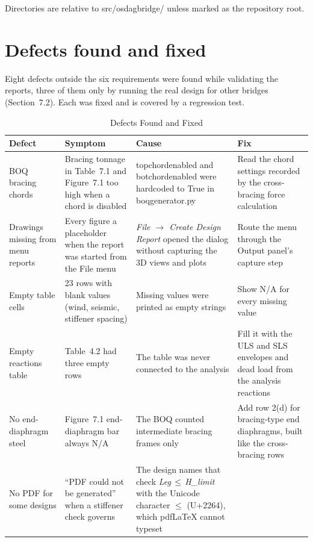 \documentclass[11pt,a4paper]{article}
\newcommand{\thead}{\rowcolor{headbg}}
\newcommand{\hd}[1]{\sffamily\bfseries\color{ink}#1}
\newcommand{\breakus}{\textunderscore\allowbreak}
\newcommand{\code}[1]{{\ttfamily\let\_\breakus #1}}
\newcommand{\file}[1]{{\ttfamily\let\_\breakus #1}}
\begin{document}
{\footnotesize\color{muted}Directories are relative to \file{src/osdagbridge/} unless marked as the repository root.}

\section{Defects found and fixed}\label{sec:defects}

Eight defects outside the six requirements were found while validating the reports, three of them only by running
the real design for other bridges (Section~7.2). Each was fixed and is covered by a regression test.

\begin{table}[!htbp]
\caption{Defects Found and Fixed}
\small
\begin{tabularx}{\linewidth}{@{}L{2.9cm} Y Y Y@{}}
\toprule
\thead \hd{Defect} & \hd{Symptom} & \hd{Cause} & \hd{Fix} \\
\midrule
BOQ bracing chords & Bracing tonnage in Table~7.1 and Figure~7.1 too high when a chord is disabled &
\code{top\_chord\_enabled} and \code{bot\_chord\_enabled} were hardcoded to \code{True} in \file{boq\_generator.py} &
Read the chord settings recorded by the cross-bracing force calculation \\
Drawings missing from menu reports & Every figure a placeholder when the report was started from the File menu &
\emph{File $\rightarrow$ Create Design Report} opened the dialog without capturing the 3D views and plots &
Route the menu through the Output panel's capture step \\
Empty table cells & 23 rows with blank values (wind, seismic, stiffener spacing) & Missing values were printed as
empty strings & Show N/A for every missing value \\
Empty reactions table & Table~4.2 had three empty rows & The table was never connected to the analysis &
Fill it with the ULS and SLS envelopes and dead load from the analysis reactions \\
No end-diaphragm steel & Figure~7.1 end-diaphragm bar always N/A & The BOQ counted intermediate bracing frames only &
Add row 2(d) for bracing-type end diaphragms, built like the cross-bracing rows \\
No PDF for some designs & ``PDF could not be generated'' when a stiffener check governs & The design names that check \emph{Leg\,$\le$\,H\_limit} with the Unicode character $\le$ (U+2264), which pdfLaTeX cannot typeset &

\end{tabularx}
\end{table}
\end{document}

